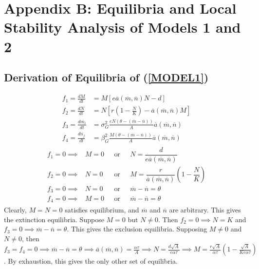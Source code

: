 \documentclass{amsart}
\theoremstyle{definition}
\theoremstyle{remark}
\numberwithin{equation}{section}
\begin{document}
\section*{Appendix B: Equilibria and Local Stability Analysis of Models 1 and 2}
\subsection*{Derivation of Equilibria of (\ref{MODEL1})}
\begin{align*}
	f_1 = \frac{dM}{dt} &= M\left[e\overline{a}(\overline{m}, \overline{n})N - d\right] \\[5px]
	f_2 = \frac{dN}{dt} &= N\left[r\left(1 - \frac{N}{K}\right) - \overline{a}(\overline{m}, \overline{n})M\right] \\[5px]
	f_3 = \frac{d\overline{m_i}}{dt} &= \sigma_{G}^2\frac{eN(\theta - (\overline{m} - \overline{n}))}{A}\overline{a}(\overline{m}, \overline{n}) \\[5px]
	f_4 = \frac{d\overline{n_j}}{dt} &= \beta_{G}^2\frac{M(\theta - (\overline{m} - \overline{n}))}{A}\overline{a}(\overline{m}, \overline{n})
\end{align*}
\begin{align*}
	\begin{array}{ccccc}
		f_1 = 0 \implies& M = 0 \ \ \ &\text{or}&\ \ \ N = \dfrac{d}{e\overline{a}(\overline{m}, \overline{n})} \\[10px]
		f_2 = 0 \implies& N = 0 \ \ \ &\text{or}&\ \ \ M = \dfrac{r}{\overline{a}(\overline{m}, \overline{n})}\left(1 - \dfrac{N}{K}\right) \\[10px]
		f_3 = 0 \implies& N = 0 \ \ \ &\text{or}&\ \ \ \overline{m} - \overline{n} = \theta \\[10px]
		f_4 = 0 \implies& M = 0 \ \ \ &\text{or}&\ \ \ \overline{m} - \overline{n} = \theta
	\end{array}
\end{align*}
Clearly, $M = N = 0$ satisfies equilibrium, and $\overline{m}$ and $\overline{n}$ are arbitrary.  This gives the extinction equilibria.  Suppose $M = 0$ but $N \neq 0$.  Then $f_2 = 0 \implies N = K$ and $f_3 = 0 \implies \overline{m} - \overline{n} = \theta$.  This gives the exclusion equilibria.  Supposing $M \neq 0$ and $N \neq 0$, then $f_3 = f_4 = 0 \implies \overline{m} - \overline{n} = \theta \implies \overline{a}(\overline{m}, \overline{n}) = \frac{\alpha\tau}{A} \implies N = \frac{d\sqrt{A}}{e\alpha\tau} \implies M = \frac{r\sqrt{A}}{\alpha\tau}\left(1 - \frac{\sqrt{A}}{Ke\alpha\tau}\right)$.  By exhaustion, this gives the only other set of equilibria.
\end{document}
